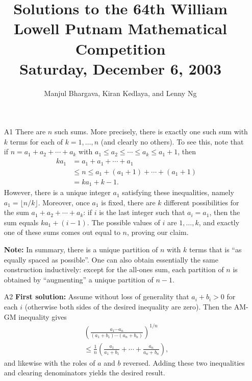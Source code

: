 \documentclass[amssymb,twocolumn,pra,10pt,aps]{revtex4-1}
\begin{document}
\title{Solutions to the 64th William Lowell Putnam Mathematical Competition \\
    Saturday, December 6, 2003}
\author{Manjul Bhargava, Kiran Kedlaya, and Lenny Ng}
\noaffiliation
\maketitle

\begin{itemize}

\item[A1]
There are $n$ such sums. More precisely, there is exactly one such sum
with $k$ terms for each of $k=1, \dots, n$ (and clearly no others).
To see this, note that if $n = a_1 + a_2 + \cdots + a_k$ with
$a_1 \leq a_2 \leq \cdots \leq a_k \leq a_1 + 1$, then
\begin{align*}
ka_1 &= a_1 + a_1 + \cdots + a_1 \\
&\leq n \leq a_1 + (a_1 + 1) + \cdots + (a_1 + 1) \\
&= ka_1 + k-1.
\end{align*}
However, there is a unique integer $a_1$ satisfying these inequalities,
namely $a_1 = \lfloor n/k \rfloor$. Moreover, once $a_1$ is fixed,
there are $k$ different possibilities for the sum $a_1 + a_2 + \cdots + a_k$:
if $i$ is the last integer such that $a_i = a_1$, then the sum equals
$ka_1 + (i-1)$. The possible values of $i$ are $1, \dots, k$,
and exactly one of these sums comes out equal to $n$, proving
our claim.

\textbf{Note:}
In summary, there is a unique partition of $n$ with $k$ terms that is
``as equally spaced as possible''.
One can also obtain essentially the same construction inductively: except
for the all-ones sum, each partition of $n$ is obtained by ``augmenting''
a unique partition of $n-1$.

\item[A2]
\textbf{First solution:}
Assume without loss of generality that $a_i + b_i > 0$
for each $i$ (otherwise both sides of the desired inequality are zero).
Then the AM-GM inequality gives
\begin{multline*}
\left( \frac{a_1\cdots a_n}{(a_1+b_1)\cdots(a_n+b_n)} \right)^{1/n} \\
\leq \frac{1}{n} \left( \frac{a_1}{a_1 + b_1} + \cdots + \frac{a_n}{a_n+b_n}
\right),
\end{multline*}
and likewise with the roles of $a$ and $b$ reversed. Adding these two
inequalities and clearing denominators yields the desired result.


\end{itemize}
\end{document}
